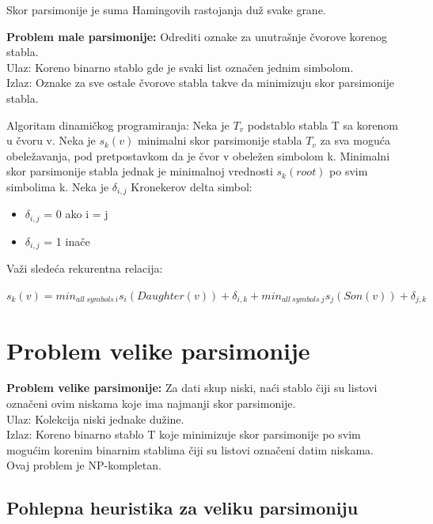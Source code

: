 Skor parsimonije je suma Hamingovih rastojanja du\v{z} svake grane.

\begin{tcolorbox}
\textbf{Problem male parsimonije:} Odrediti oznake za unutra\v{s}nje \v{c}vorove korenog stabla. \\
Ulaz: Koreno binarno stablo gde je svaki list ozna\v{c}en jednim simbolom.\\
Izlaz: Oznake za sve ostale \v{c}vorove stabla takve da minimizuju skor parsimonije stabla.
\end{tcolorbox}

Algoritam dinami\v{c}kog programiranja: Neka je $T_v$ podstablo stabla T sa korenom u \v{c}voru v. Neka je $s_k(v)$ minimalni skor parsimonije stabla $T_v$ za sva mogu\'ca obele\v{z}avanja, pod pretpostavkom da je \v{c}vor v obele\v{z}en simbolom k. Minimalni skor parsimonije stabla jednak je minimalnoj vrednosti $s_k(root)$ po svim simbolima k. Neka je \textit{$\delta_{i, j}$} Kronekerov delta simbol:
\begin{itemize}
\item \textit{$\delta_{i, j}$} = 0 ako i = j
\item \textit{$\delta_{i, j}$} = 1 ina\v{c}e
\end{itemize}
Va\v{z}i slede\'ca rekurentna relacija:
\begin{tcolorbox}
$s_k(v) = min_{all\ symbols\ i} {s_i(Daughter(v)) + \delta_{i,k}} + min_{all\ symbols\ j} {s_j(Son(v)) + \delta_{j,k}}$
\end{tcolorbox}

\section{Problem velike parsimonije}
\label{sec:pvp}

\begin{tcolorbox}
\textbf{Problem velike parsimonije:} Za dati skup niski, na\'ci stablo \v{c}iji su listovi ozna\v{c}eni ovim niskama koje ima najmanji skor parsimonije. \\
Ulaz: Kolekcija niski jednake du\v{z}ine. \\
Izlaz: Koreno binarno stablo T koje minimizuje skor parsimonije po svim mogu\'cim korenim binarnim stablima \v{c}iji su listovi ozna\v{c}eni datim niskama.\\
Ovaj problem je NP-kompletan.
\end{tcolorbox}

\subsection{Pohlepna heuristika za veliku parsimoniju}
\label{phzvp}

